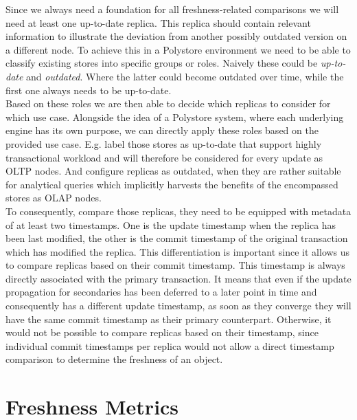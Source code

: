 Since we always need a foundation for all freshness-related comparisons we will need at least one up-to-date replica. 
This replica should contain relevant information to illustrate the deviation from another possibly outdated version on a different node.
To achieve this in a Polystore environment we need to be able to classify existing stores into specific groups or roles.
Naively these could be \emph{up-to-date} and \emph{outdated}. Where the latter could become outdated over time, while the first one always needs to be up-to-date. \\
Based on these roles we are then able to decide which replicas to consider for which use case.
Alongside the idea of a Polystore system, where each underlying engine has its own purpose, we can directly apply these roles 
based on the provided use case. E.g. label those stores as up-to-date that support highly transactional workload and will therefore be considered for every update as OLTP nodes.
And configure replicas as outdated, when they are rather suitable for analytical queries which implicitly harvests the benefits of the encompassed stores as OLAP nodes. \\
To consequently, compare those replicas, they need to be equipped with metadata of at least two timestamps. 
One is the update timestamp when the replica has been last modified,
the other is the commit timestamp of the original transaction which has modified the replica.
This differentiation is important since it allows us to compare replicas based on their commit timestamp. This timestamp is always directly associated with the primary transaction.
It means that even if the update propagation for secondaries has been deferred to a later point in time and consequently has a different update timestamp, 
as soon as they converge they will have the same commit timestamp as their primary counterpart.
Otherwise, it would not be possible to compare replicas based on their timestamp, since individual commit timestamps per replica would not allow a direct timestamp comparison 
to determine the freshness of an object.



\section{Freshness Metrics}
\label{sec:freshne_metrics}

